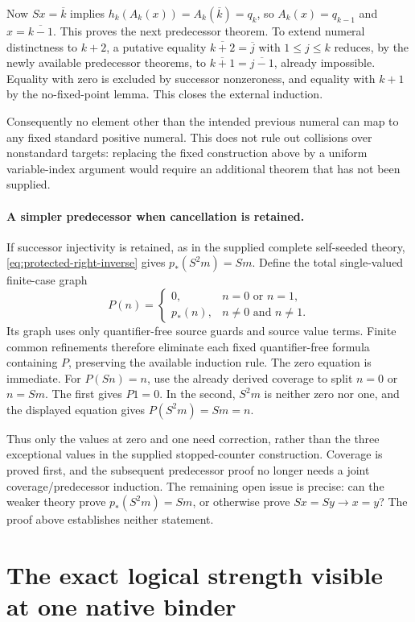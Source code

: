 \documentclass[11pt]{article}
\theoremstyle{definition}\newtheorem{definition}[theorem]{Definition}
\begin{document}
Now $Sx=\overline{k}$ implies
$h_k(A_k(x))=A_k(\overline{k})=q_k$, so $A_k(x)=q_{k-1}$ and
$x=\overline{k-1}$. This proves the next predecessor theorem.
To extend numeral distinctness to $k+2$, a putative equality
$\overline{k+2}=\overline{j}$ with $1\le j\le k$ reduces, by the
newly available predecessor theorems, to
$\overline{k+1}=\overline{j-1}$, already impossible. Equality with
zero is excluded by successor nonzeroness, and equality with $k+1$
by the no-fixed-point lemma. This closes the external induction.

Consequently no element other than the intended previous numeral can
map to any fixed standard positive numeral. This does not rule out
collisions over nonstandard targets: replacing the fixed construction
above by a uniform variable-index argument would require an additional
theorem that has not been supplied.

\paragraph{A simpler predecessor when cancellation is retained.}
If successor injectivity is retained, as in the supplied complete
self-seeded theory, \eqref{eq:protected-right-inverse} gives
$p_*(S^2m)=Sm$. Define the total single-valued finite-case graph
\[
 P(n)=
 \begin{cases}
 0,&n=0\text{ or }n=1,\\
 p_*(n),&n\ne0\text{ and }n\ne1.
 \end{cases}
\]
Its graph uses only quantifier-free source guards and source value
terms. Finite common refinements therefore eliminate each fixed
quantifier-free formula containing $P$, preserving the available
induction rule. The zero equation is immediate. For $P(Sn)=n$,
use the already derived coverage to split $n=0$ or $n=Sm$.
The first gives $P1=0$. In the second, $S^2m$ is neither zero nor
one, and the displayed equation gives $P(S^2m)=Sm=n$.

Thus only the values at zero and one need correction, rather than
the three exceptional values in the supplied stopped-counter
construction. Coverage is proved first, and the subsequent
predecessor proof no longer needs a joint coverage/predecessor
induction. The remaining open issue is precise: can the weaker
theory prove $p_*(S^2m)=Sm$, or otherwise prove $Sx=Sy\to x=y$?
The proof above establishes neither statement.

\section{The exact logical strength visible at one native binder}
\label{sec:depth-one-boundary}
\end{document}
